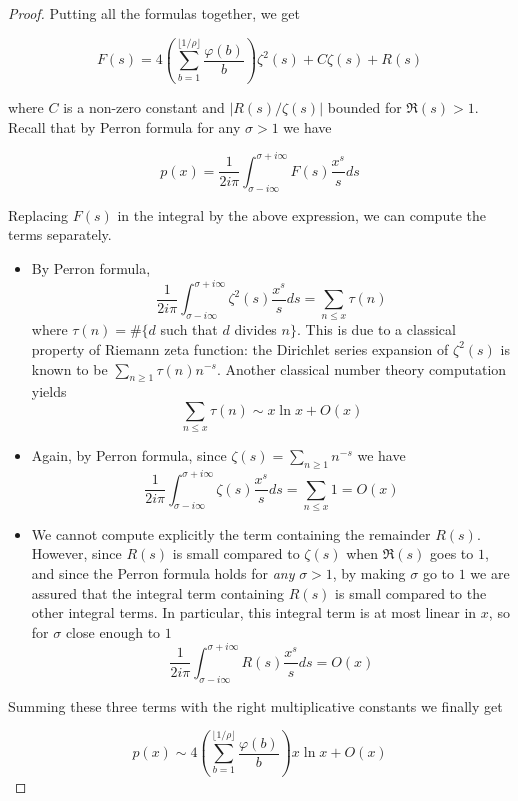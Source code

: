 \documentclass{article}
\theoremstyle{definition}
\begin{document}
\begin{proof}
Putting all the formulas together, we get

$$F(s) = 4 \left ( \sum_{b=1}^{\lfloor 1/\rho \rfloor}\frac{\varphi(b)}{b} \right ) \zeta^2(s) + C \zeta(s) + R(s)$$

where $C$ is a non-zero constant and $|R(s) / \zeta(s) |$ bounded for $\Re(s)> 1$. Recall that by Perron formula for any $\sigma >1$ we have

$$p(x) = \frac{1}{2i\pi}\int_{\sigma-i\infty}^{\sigma+i\infty} F(s) \frac{x^s}{s}ds$$

Replacing $F(s)$ in the integral by the above expression, we can compute the terms separately.

 \begin{itemize}\renewcommand{\labelitemi}{$\bullet$}
\item By Perron formula, 
$$ \frac{1}{2i\pi}\int_{\sigma-i\infty}^{\sigma+i\infty} \zeta^2(s) \frac{x^s}{s}ds = \sum_{n\le x} \tau(n) $$
where $\tau(n)=\#  \{ d$ such that $d$ divides $n \}$. This is due to a classical property of Riemann zeta function: the Dirichlet series expansion of $\zeta^2(s)$ is known to be $\sum\limits_{n\ge 1} \tau(n) n^{-s}$. Another classical number theory computation yields
$$\sum_{n\le x} \tau(n) \sim x \ln x + O(x) $$

\item Again, by Perron formula, since $\zeta(s) = \sum\limits_{n\ge 1} n^{-s}$ we have 
$$ \frac{1}{2i\pi}\int_{\sigma-i\infty}^{\sigma+i\infty} \zeta(s) \frac{x^s}{s}ds = \sum_{n\le x} 1 = O(x) $$

\item We cannot compute explicitly the term containing the remainder $R(s)$. However, since $R(s)$ is small compared to $\zeta(s)$ when $\Re(s)$ goes to $1$, and since the Perron formula holds for \emph{any} $\sigma > 1$, by making $\sigma$ go to $1$ we are assured that the integral term containing $R(s)$ is small compared to the other integral terms. In particular, this integral term is at most linear in $x$, so for $\sigma$ close enough to $1$
$$ \frac{1}{2i\pi}\int_{\sigma-i\infty}^{\sigma+i\infty} R(s) \frac{x^s}{s}ds = O(x) $$

 \end{itemize}

Summing these three terms with the right multiplicative constants we finally get

$$p(x) \sim 4 \left(\sum_{b=1}^{\lfloor 1/\rho \rfloor} \frac{\varphi(b)}{b}\right )  x \ln x + O(x)$$


\end{proof}
\end{document}
